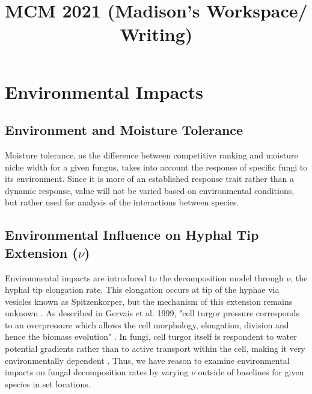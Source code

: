 \documentclass{article}
\title{MCM 2021 (Madison's Workspace/ Writing)}
\author{}
\date{}
\begin{document}



\maketitle

\section{Environmental Impacts}

\subsection{Environment and Moisture Tolerance}
Moisture tolerance, as the difference between competitive ranking and moisture niche width for a given fungus, takes into account the response of specific fungi to its environment. Since it is more of an established response trait rather than a dynamic response, value will not be varied based on environmental conditions, but rather used for analysis of the interactions between species.

\subsection{Environmental Influence on Hyphal Tip Extension ($\nu$)}
Environmental impacts are introduced to the decomposition model through $\nu$, the hyphal tip elongation rate. This elongation occurs at tip of the hyphae via vesicles known as Spitzenkorper, but the mechanism of this extension remains unknown \cite{Steinberg2007}. As described in Gervais et al. 1999, "cell turgor pressure corresponds to an overpressure which allows the cell morphology, elongation, division and hence the biomass evolution" \cite{Gervais1999}. In fungi, cell turgor itself is respondent to water potential gradients rather than to active transport within the cell, making it very environmentally dependent \cite{Gervais1999}. Thus, we have reason to examine environmental impacts on fungal decomposition rates by varying $\nu$ outside of baselines for given species in set locations.
\end{document}
